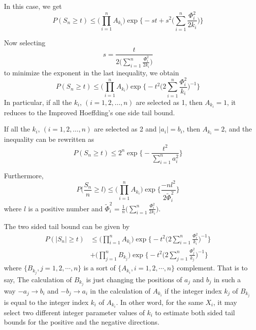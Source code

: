 \documentclass[journal]{IEEEtran}
\begin{document}
In this case,  we get
\begin{equation}
P(S_n\geq t)\leq \Big(\prod_{i=1}^n A_{k_i}\Big) \exp\Big\{-st+s^2\Big(\sum_{i=1}^n \frac{\Phi_i^2}{2k_i}\Big)\Big\}
\end{equation}

Now selecting
\begin{equation}
s=\frac{t}{2\Big(\sum_{i=1}^n \frac{\Phi_i^2}{2k_i}\Big)}
\end{equation}
to minimize the exponent in the last inequality, we obtain
\begin{equation} \label{one side tail bound}
P(S_n\geq t)\leq \Big(\prod_{i=1}^n A_{k_i}\Big)\exp\Big\{-t^2\Big(2\sum_{i=1}^n \frac{\Phi_i^2}{k_i}\Big)^{-1}\Big\}
\end{equation}
In particular, if all the $k_i$, $(i=1,2,\dots,n)$ are selected as 1, then $A_{k_i}=1$, it reduces to the Improved Hoeffding's one side tail bound.

If all the $k_i$, $(i=1,2,\dots,n)$ are selected as 2 and $|a_i|=b_i$, then $A_{k_i}=2$, and the inequality can be rewritten as
\begin{equation}
P(S_n\geq t)\leq 2^n \exp\Big\{-\frac{t^2}{\sum_{i=1}^n a_i^2}\Big\}
\end{equation}

Furthermore,
\begin{equation}
P\Big(\frac{S_n}{n}\geq l \Big)\leq \Big(\prod_{i=1}^n A_{k_i}\Big) \exp\Big\{\frac{-nl^2}{2\tilde{\Phi}_i^2}\Big\}
\end{equation}
where $l$ is a positive number and
$\tilde{\Phi}_i^2=\frac{1}{n}\Big(\sum_{i=1}^n \frac{\Phi_i^2}{2k_i}\Big)$.

The two sided tail bound can be given by
\begin{equation}
\begin{split}
P(|S_n|\geq t){}&\leq \Big(\prod_{i=1}^n A_{k_i}\Big)\exp\Big\{-t^2\Big(2\sum_{i=1}^n \frac{\Phi_i^2}{k_i}\Big)^{-1}\Big\}{}\\
&+\Big(\prod_{j=1}^n B_{k_j}\Big)\exp\Big\{-t^2\Big(2\sum_{j=1}^n \frac{\Phi_j^2}{k_j}\Big)^{-1}\Big\}
\end{split}
\end{equation}
where $\{B_{k_j},j=1,2,\cdots, n\}$ is a sort of $\{A_{k_i},i=1,2,\cdots, n\}$ complement. That is to say, The calculation of $B_{k_j}$ is  just changing the positions of $a_j$ and $b_j$ in such a way $-a_j\rightarrow b_i$ and $-b_j\rightarrow a_i$ in the calculation of $A_{k_i}$ if the integer index $k_j$ of $B_{k_j}$ is equal to the integer index $k_i$ of  $A_{k_i}$.  In other word, for the same $X_i$,  it may select two different integer parameter values of $k_i$  to estimate both sided tail bounds for the positive and the negative directions.
\end{document}
